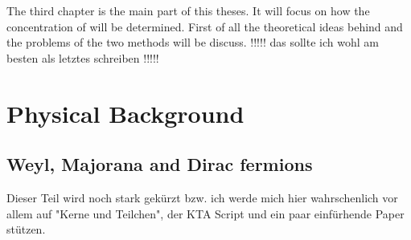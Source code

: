 \documentclass[encoding=utf8,british]{tumphthesis}
\begin{document}
The third chapter is the main part of this theses. 
It will focus on how the concentration of \Kr will be determined. 
First of all the theoretical ideas behind and the problems of the two methods will be discuss. !!!!! das sollte ich wohl am besten als letztes schreiben !!!!!


\chapter{Physical Background}
\label{sec:PhyBG}

\section{Weyl, Majorana and Dirac fermions}
\label{sec:WMDf}


Dieser Teil wird noch stark gekürzt bzw. ich werde mich hier wahrschenlich vor allem auf "Kerne und Teilchen", der KTA Script und ein paar einfürhende Paper stützen.

\end{document}

